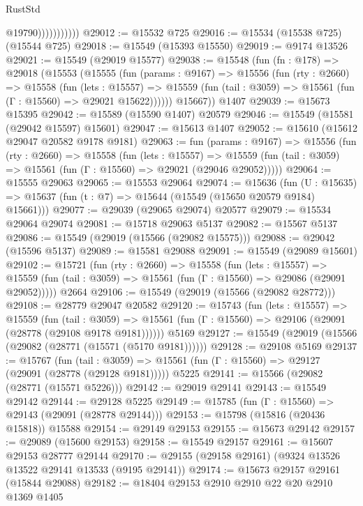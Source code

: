 \begin{lexlean}{RustStd}
\begin{coremodule}
                          @19790)))))))))))
@29012 := @15532 @725
@29016 := @15534 (@15538 @725) (@15544 @725)
@29018 := @15549 (@15393 @15550)
@29019 := @9174 @13526
@29021 := @15549 (@29019 @15577)
@29038 := @15548
    (fun (fn : @178) =>
    @29018
      (@15553
        (@15555
          (fun (params : @9167) =>
          @15556
            (fun (rty : @2660) =>
            @15558
              (fun (lets : @15557) =>
              @15559 (fun (tail : @3059) => @15561 (fun (Γ : @15560) => @29021 @15622))))))
        @15667))
    @1407
@29039 := @15673 @15395
@29042 := @15589 (@15590 @1407) @20579
@29046 := @15549 (@15581 (@29042 @15597) @15601)
@29047 := @15613 @1407
@29052 := @15610 (@15612 @29047 @20582 @9178 @9181)
@29063 := fun (params : @9167) =>
  @15556
    (fun (rty : @2660) =>
    @15558
      (fun (lets : @15557) =>
      @15559 (fun (tail : @3059) => @15561 (fun (Γ : @15560) => @29021 (@29046 @29052)))))
@29064 := @15555 @29063
@29065 := @15553 @29064
@29074 := @15636
    (fun (U : @15635) => @15637 (fun (t : @7) => @15644 (@15549 (@15650 @20579 @9184) @15661)))
@29077 := @29039 (@29065 @29074) @20577
@29079 := @15534 @29064 @29074
@29081 := @15718 @29063 @5137
@29082 := @15567 @5137
@29086 := @15549 (@29019 (@15566 (@29082 @15575)))
@29088 := @29042 (@15596 @5137)
@29089 := @15581 @29088
@29091 := @15549 (@29089 @15601)
@29102 := @15721
    (fun (rty : @2660) =>
    @15558
      (fun (lets : @15557) =>
      @15559 (fun (tail : @3059) => @15561 (fun (Γ : @15560) => @29086 (@29091 @29052)))))
    @2664
@29106 := @15549 (@29019 (@15566 (@29082 @28772)))
@29108 := @28779 @29047 @20582
@29120 := @15743
    (fun (lets : @15557) =>
    @15559
      (fun (tail : @3059) =>
      @15561 (fun (Γ : @15560) => @29106 (@29091 (@28778 (@29108 @9178 @9181))))))
    @5169
@29127 := @15549 (@29019 (@15566 (@29082 (@28771 (@15571 (@5170 @9181))))))
@29128 := @29108 @5169
@29137 := @15767
    (fun (tail : @3059) => @15561 (fun (Γ : @15560) => @29127 (@29091 (@28778 (@29128 @9181)))))
    @5225
@29141 := @15566 (@29082 (@28771 (@15571 @5226)))
@29142 := @29019 @29141
@29143 := @15549 @29142
@29144 := @29128 @5225
@29149 := @15785 (fun (Γ : @15560) => @29143 (@29091 (@28778 @29144)))
@29153 := @15798 (@15816 (@20436 @15818)) @15588
@29154 := @29149 @29153
@29155 := @15673 @29142
@29157 := @29089 (@15600 @29153)
@29158 := @15549 @29157
@29161 := @15607 @29153 @28777 @29144
@29170 := @29155 (@29158 @29161) (@9324 @13526 @13522 @29141 @13533 (@9195 @29141))
@29174 := @15673 @29157 @29161 (@15844 @29088)
@29182 := @18404 @29153 @2910 @2910 @22 @20 @2910 @1369 @1405

\end{coremodule}
\end{lexlean}
